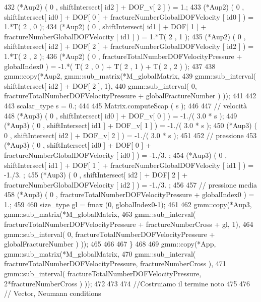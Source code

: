 \begin{DoxyCode}
432         (*Aup2) ( 0 , shiftIntersect[ id2 ] + DOF\_v[ 2 ] )  = 1.;
433         (*Aup2) ( 0 , shiftIntersect[ id0 ] + DOF[ 0 ] + fractureNumberGlobalDOFVelocity [ id0 ] ) = 1.*T( 
      2 , 0 );
434         (*Aup2) ( 0 , shiftIntersect[ id1 ] + DOF[ 1 ] + fractureNumberGlobalDOFVelocity [ id1 ] ) = 1.*T( 
      2 , 1 );
435         (*Aup2) ( 0 , shiftIntersect[ id2 ] + DOF[ 2 ] + fractureNumberGlobalDOFVelocity [ id2 ] ) = 1.*T( 
      2 , 2 );
436         (*Aup2) ( 0 , fractureTotalNumberDOFVelocityPressure + globalIndex0 ) = -1.*( T( 2 , 0 ) + T( 2 , 1
       ) + T( 2 , 2 ) );
437         
438         gmm::copy(*Aup2, gmm::sub\_matrix(*M\_globalMatrix, 
439                 gmm::sub\_interval( shiftIntersect[ id2 ] + DOF[ 2 ], 1), 
440                 gmm::sub\_interval( 0, fractureTotalNumberDOFVelocityPressure + globalFractureNumber ) ));
441         
442         
443         scalar\_type s = 0.;
444         
445         Matrix.computeScap ( s );
446 
447         \textcolor{comment}{// velocità}
448         (*Aup3) ( 0 , shiftIntersect[ id0 ] + DOF\_v[ 0 ] )  = -1./( 3.0 * s );
449         (*Aup3) ( 0 , shiftIntersect[ id1 ] + DOF\_v[ 1 ] )  = -1./( 3.0 * s );
450         (*Aup3) ( 0 , shiftIntersect[ id2 ] + DOF\_v[ 2 ] )  = -1./( 3.0 * s );
451 
452         \textcolor{comment}{// pressione }
453         (*Aup3) ( 0 , shiftIntersect[ id0 ] + DOF[ 0 ] + fractureNumberGlobalDOFVelocity [ id0 ] ) = -1./3.
      ;
454         (*Aup3) ( 0 , shiftIntersect[ id1 ] + DOF[ 1 ] + fractureNumberGlobalDOFVelocity [ id1 ] ) = -1./3.
      ;
455         (*Aup3) ( 0 , shiftIntersect[ id2 ] + DOF[ 2 ] + fractureNumberGlobalDOFVelocity [ id2 ] ) = -1./3.
      ;
456 
457         \textcolor{comment}{// pressione media}
458         (*Aup3) ( 0 , fractureTotalNumberDOFVelocityPressure + globalIndex0 ) = 1.;
459 
460         size\_type gl = fmax (0, globalIndex0-1);
461 
462         gmm::copy(*Aup3, gmm::sub\_matrix(*M\_globalMatrix, 
463                 gmm::sub\_interval( fractureTotalNumberDOFVelocityPressure + fractureNumberCross + gl, 1), 
464                 gmm::sub\_interval( 0, fractureTotalNumberDOFVelocityPressure + globalFractureNumber ) ));
465         
466         
467     \}
468 
469     gmm::copy(*App, gmm::sub\_matrix(*M\_globalMatrix, 
470             gmm::sub\_interval( fractureTotalNumberDOFVelocityPressure, fractureNumberCross ), 
471             gmm::sub\_interval( fractureTotalNumberDOFVelocityPressure, 2*fractureNumberCross ) ));
472   
473     
474     \textcolor{comment}{//Costruiamo il termine noto}
475     
476     \textcolor{comment}{// Vector, Neumann conditions}

\end{DoxyCode}
